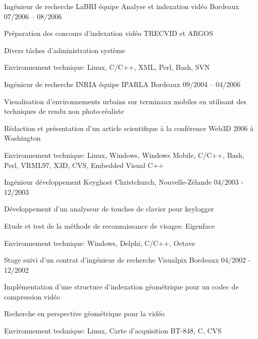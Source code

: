 \begin{cventries}
  \cventry
    {Ingénieur de recherche}
    {LaBRI équipe Analyse et indexation vidéo}
    {Bordeaux}
    {07/2006 – 08/2006}
    {
      \begin{cvitems}
        \item {Préparation des concours d'indexation vidéo TRECVID et ARGOS}
        \item {Divers tâches d'administration système}
        \item {Environnement technique: Linux, C/C++, XML, Perl, Bash, SVN}
      \end{cvitems}
    }
  \cventry
    {Ingénieur de recherche}
    {INRIA équipe IPARLA}
    {Bordeaux}
    {09/2004 – 04/2006}
    {
      \begin{cvitems}
        \item {Visualisation d'environnements urbains sur terminaux mobiles en utilisant des techniques de
rendu non photo-réaliste}
        \item {Rédaction et présentation d'un article scientifique à la conférence Web3D 2006 à Washington}
        \item {Environnement technique: Linux, Windows, Windows Mobile, C/C++, Bash, Perl, VRML97, X3D, CVS, Embedded Visual C++}
      \end{cvitems}
    }
  \cventry
    {Ingénieur développement}
    {Keyghost}
    {Christchurch, Nouvelle-Zélande}
    {04/2003 - 12/2003}
    {
      \begin{cvitems}
        \item {Développement d'un analyseur de touches de clavier pour keylogger}
        \item {Etude et test de la méthode de reconnaissance de visages: Eigenface}
		\item {Environnement technique: Windows, Delphi, C/C++, Octave}
      \end{cvitems}
    }
  \cventry
    {Stage suivi d'un contrat d'ingénieur de recherche}
    {Visualpix}
    {Bordeaux}
    {04/2002 - 12/2002}
    {
      \begin{cvitems}
        \item {Implémentation d'une structure d'indexation géométrique pour un codec de compression vidéo}
		\item {Recherche en perspective géométrique pour la vidéo}
		\item {Environnement technique: Linux, Carte d'acquisition BT-848, C, CVS}
      \end{cvitems}
}
\end{cventries}

